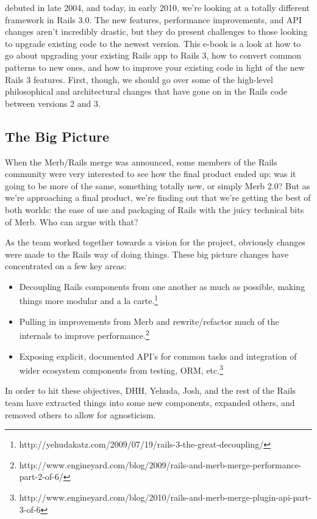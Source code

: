 \documentclass{book}
\begin{document}
 

\maketitle



\newpageRails debuted in late 2004, and today, in early 2010, we'{}re looking at a totally different framework in Rails 3.0. The new features, performance improvements, and API changes aren'{}t incredibly drastic, but they do present challenges to those looking to upgrade existing code to the newest version. This e-book is a look at how to go about upgrading your existing Rails app to Rails 3, how to convert common patterns to new ones, and how to improve your existing code in light of the new Rails 3 features. First, though, we should go over some of the high-level philosophical and architectural changes that have gone on in the Rails code between versions 2 and 3.

\hypertarget{the_big_picture}{}\subsection*{{The Big Picture}}\label{the_big_picture}

When the Merb/Rails merge was announced, some members of the Rails community were very interested to see how the final product ended up: was it going to be more of the same, something totally new, or simply Merb 2.0? But as we'{}re approaching a final product, we'{}re finding out that we'{}re getting the best of both worlds: the ease of use and packaging of Rails with the juicy technical bits of Merb. Who can argue with that?

As the team worked together towards a vision for the project, obviously changes were made to the Rails way of doing things. These big picture changes have concentrated on a few key areas:

\begin{itemize}%
\item Decoupling Rails components from one another as much as possible, making things more modular and a la carte.\footnote{http://yehudakatz.com/2009/07/19/rails-3-the-great-decoupling/} 
\item Pulling in improvements from Merb and rewrite/refactor much of the internals to improve performance.\footnote{http://www.engineyard.com/blog/2009/rails-and-merb-merge-performance-part-2-of-6/} 
\item Exposing explicit, documented API'{}s for common tasks and integration of wider ecosystem components from testing, ORM, etc.\footnote{http://www.engineyard.com/blog/2010/rails-and-merb-merge-plugin-api-part-3-of-6} 

\end{itemize}
In order to hit these objectives, DHH, Yehuda, Josh, and the rest of the Rails team have extracted things into some new components, expanded others, and removed others to allow for agnosticism.
\end{document}
